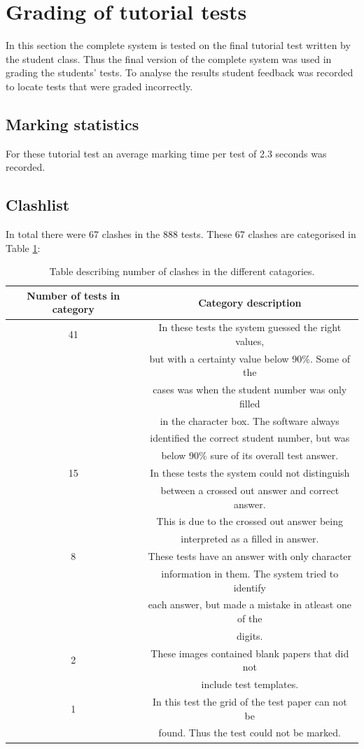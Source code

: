 \section{Grading of tutorial tests}

In this section the complete system is tested on the final tutorial test written by the student class. Thus the final version of the complete system was used in grading the students' tests. To analyse the results student feedback was recorded to locate tests that were graded incorrectly. 

\subsection{Marking statistics}

For these tutorial test  an average marking time per test of 2.3 seconds was recorded.

\subsection{Clashlist}

In total there were 67 clashes in the 888 tests. These 67 clashes are categorised in Table  \ref{tbl:TutClash}:
\begin{table}
  \centering
\begin{tabular}{|c|c|}
\hline
\textbf{Number of tests in category} & \textbf{Category description}\\
\hline
41&In these tests the system guessed the right values,\\ 
&but with a certainty value below 90\%. Some of the\\
&cases was when the student number was only filled\\
&in the character box. The software always\\
&identified the correct student number, but was\\
&below 90\% sure of its overall test answer.\\
\hline
15&In these tests the system could not distinguish\\ 
&between a crossed out answer and correct answer.\\
&This is due to the crossed out answer being\\
&interpreted as a filled in answer.\\
\hline
8&These tests have an answer with only character\\ 
&information in them. The system tried to identify\\
&each answer, but made a mistake in atleast one of the\\
&digits.\\
\hline
2&These images contained blank papers that did not\\ 
&include test templates.\\
\hline
1&In this test the grid of the test paper can not be\\ 
&found. Thus the test could not be marked.\\
\hline
\end{tabular}
  \caption{Table describing number of clashes in the different catagories.} \label{tbl:TutClash}
\end{table}

